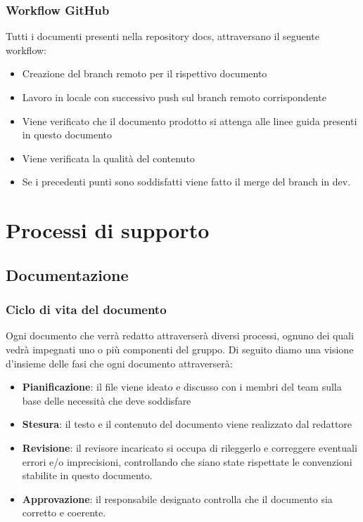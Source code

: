 \documentclass[12pt]{article}
\begin{document}
\subsubsection{Workflow GitHub}
Tutti i documenti presenti nella repository docs, attraversano il seguente workflow:

\begin{itemize}
    \item Creazione del branch remoto per il rispettivo documento
    \item Lavoro in locale con successivo push sul branch remoto corrispondente
    \item Viene verificato che il documento prodotto si attenga alle linee guida presenti in questo documento
    \item Viene verificata la qualità del contenuto
    \item Se i precedenti punti sono soddisfatti viene fatto il merge del branch in dev. 
\end{itemize}

\section{Processi di supporto}

\subsection{Documentazione}
\subsubsection{Ciclo di vita del documento}
Ogni documento che verrà redatto attraverserà diversi processi, ognuno dei quali vedrà impegnati uno o più componenti del gruppo.
Di seguito diamo una visione d'insieme delle fasi che ogni documento attraverserà:
\begin{itemize}
    \item \textbf{Pianificazione}: il file viene ideato e discusso con i membri del team sulla base delle necessità che deve soddisfare
    \item \textbf{Stesura}: il testo e il contenuto del documento viene realizzato dal redattore
    \item \textbf{Revisione}: il revisore incaricato si occupa di rileggerlo e correggere eventuali errori e/o imprecisioni, controllando che siano state rispettate le convenzioni stabilite in questo documento.
    \item \textbf{Approvazione}: il responsabile designato controlla che il documento sia corretto e coerente.
\end{itemize}
\end{document}
